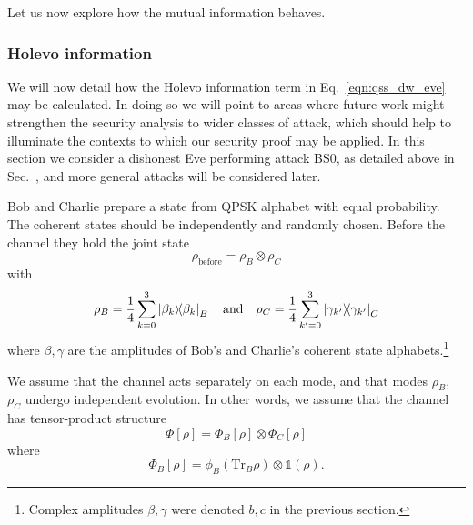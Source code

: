 Let us now explore how the mutual information behaves. 

\subsubsection{Holevo information}

We will now detail how the Holevo information term in Eq.~\ref{eqn:qss_dw_eve} may be calculated. In doing so we will point to areas where future work might strengthen the security analysis to wider classes of attack, which should help to illuminate the contexts to which our security proof may be applied. In this section we consider a dishonest Eve performing attack BS$0$, as detailed above in Sec.~, and more general attacks will be considered later.

Bob and Charlie prepare a state from QPSK alphabet with equal probability. The coherent states should be independently and randomly chosen. Before the channel they hold the joint state
\begin{equation}
\rho_{\text{before}} = \rho_B \otimes \rho_C
\end{equation}
with
\begin{equation}
\rho_B = \frac{1}{4} \sum_{k=0}^3 \dyad{\beta_k}_B \qq{and} \rho_C = \frac{1}{4} \sum_{k^\prime = 0}^3 \dyad{\gamma_{k^\prime}}_C
\end{equation}
where $\beta, \gamma$ are the amplitudes of Bob's and Charlie's coherent state alphabets.\footnote{Complex amplitudes $\beta, \gamma$ were denoted $b, c$ in the previous section.}

We assume that the channel acts separately on each mode, and that modes $\rho_B$, $\rho_C$ undergo independent evolution. In other words, we assume that the channel has tensor-product structure
\begin{equation}
\Phi\left[\rho\right] = \Phi_B\left[\rho\right] \otimes \Phi_C\left[\rho\right]
\end{equation}
where 
\begin{equation}
\Phi_B\left[\rho\right] = \phi_B\left(\text{Tr}_B \rho\right) \otimes \mathbb{1}\left(\rho\right).
\end{equation}

